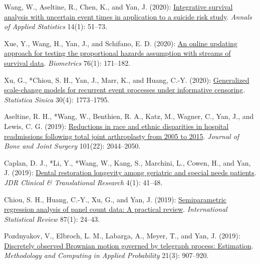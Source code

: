 \begin{RefereedJournalArticles}
\item *Wang, W., Aseltine, R., Chen, K., and Yan, J. (2020):
\href{https://doi.org/10.1214/19-AOAS1287}{Integrative survival analysis
with uncertain event times in application to a suicide risk study}.
\emph{Annals of Applied Statistics} 14(1): 51--73.

\item *Xue, Y., Wang, H., Yan, J., and Schifano, E. D. (2020):
\href{https://doi.org/10.1111/biom.13137}{An online updating approach
for testing the proportional hazards assumption with streams of survival
data}. \emph{Biometrics} 76(1): 171--182.

\item Xu, G., *Chiou, S. H., Yan, J., Marr, K., and Huang, C.-Y.
(2020): \href{https://doi.org/10.5705/ss.202018.0224}{Generalized
scale-change models for recurrent event processes under informative
censoring}. \emph{Statistica Sinica} 30(4): 1773--1795.

\item Aseltine, R. H., *Wang, W., Benthien, R. A., Katz, M.,
Wagner, C., Yan, J., and Lewis, C. G. (2019):
\href{https://doi.org/10.2106/JBJS.18.01112}{Reductions in race and
ethnic disparities in hospital readmissions following total joint
arthroplasty from 2005 to 2015}. \emph{Journal of Bone and Joint
Surgery} 101(22): 2044--2050.

\item Caplan, D. J., *Li, Y., *Wang, W., Kang, S.,
Marchini, L., Cowen, H., and Yan, J. (2019):
\href{https://doi.org/10.1177/2380084418799083}{Dental restoration
longevity among geriatric and special needs patients}. \emph{JDR
Clinical \& Translational Research} 4(1): 41--48.

\item *Chiou, S. H., Huang, C.-Y., Xu, G., and Yan, J. (2019):
\href{https://doi.org/10.1111/insr.12271}{Semiparametric regression
analysis of panel count data: A practical review}. \emph{International
Statistical Review} 87(1): 24--43.

\item Pozdnyakov, V., Elbroch, L. M., Labarga, A., Meyer, T., and Yan, J.
(2019): \href{https://doi.org/10.1007/s11009-017-9547-6}{Discretely
observed Brownian motion governed by telegraph process: Estimation}.
\emph{Methodology and Computing in Applied Probability} 21(3): 907--920.


\end{RefereedJournalArticles}
